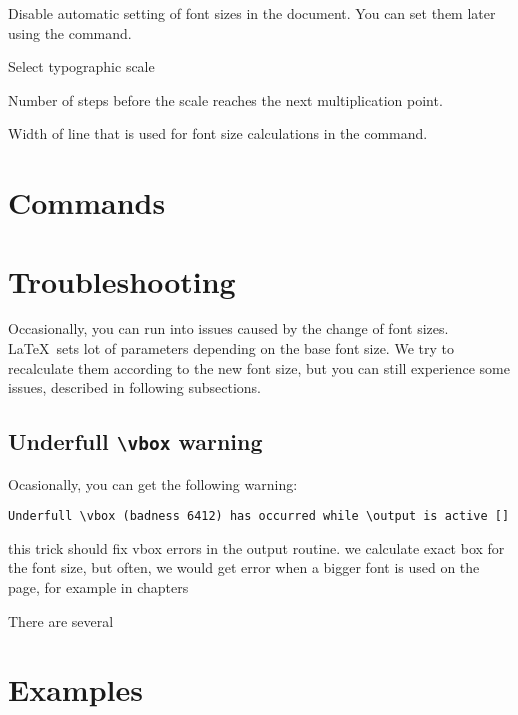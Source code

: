 \documentclass{ltxdoc}
\begin{document}
\noindent {}  Disable automatic setting of font sizes in the document. You can set them 
later using the \cmd{\setsizes} command.

\noindent {} Select typographic scale

\noindent {} Number of steps before the scale reaches the next multiplication point.

\noindent {} 

\noindent {} 

\noindent {} Width of line that is used for font size calculations in the \cmd{\setsizes} command.




\section{Commands}

\DescribeMacro\setsizes
\cmd\setsizes{}


\section{Troubleshooting}

Occasionally, you can run into issues caused by the change of font sizes. \LaTeX\ sets lot of parameters 
depending on the base font size. We try to recalculate them according to the new font size, but you can still
experience some issues, described in following subsections.

\subsection{Underfull \texttt{\textbackslash vbox} warning}

Ocasionally, you can get the following warning:

\begin{verbatim}
Underfull \vbox (badness 6412) has occurred while \output is active []
\end{verbatim}


this trick should fix vbox errors in the output routine. 
we calculate exact box for the font size, but often,
we would get error when a bigger font is used on the page,
for example in chapters

There are several 
  \def\@textbottom{\vskip \z@ \@plus \resp_font_size \@minus \resp_font_size}
\section{Examples}
\end{document}
